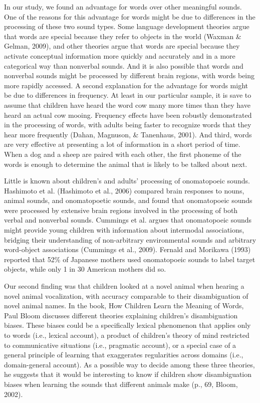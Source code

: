 \documentclass[english,floatsintext,man]{apa6}
\theoremstyle{definition}
\theoremstyle{definition}
\theoremstyle{definition}
\theoremstyle{remark}
\begin{document}
In our study, we found an advantage for words over other meaningful
sounds. One of the reasons for this advantage for words might be due to
differences in the processing of these two sound types. Some language
development theories argue that words are special because they refer to
objects in the world (Waxman \& Gelman, 2009), and other theories argue
that words are special because they activate conceptual information more
quickly and accurately and in a more categorical way than nonverbal
sounds. And it is also possible that words and nonverbal sounds might be
processed by different brain regions, with words being more rapidly
accessed. A second explanation for the advantage for words might be due
to differences in frequency. At least in our particular sample, it is
save to assume that children have heard the word cow many more times
than they have heard an actual cow mooing. Frequency effects have been
robustly demonstrated in the processing of words, with adults being
faster to recognize words that they hear more frequently (Dahan,
Magnuson, \& Tanenhaus, 2001). And third, words are very effective at
presenting a lot of information in a short period of time. When a dog
and a sheep are paired with each other, the first phoneme of the words
is enough to determine the animal that is likely to be talked about
next.

Little is known about children's and adults' processing of onomatopoeic
sounds. Hashimoto et al. (Hashimoto et al., 2006) compared brain
responses to nouns, animal sounds, and onomatopoetic sounds, and found
that onomatopoeic sounds were processed by extensive brain regions
involved in the processing of both verbal and nonverbal sounds. Cummings
et al. argues that onomatopoeic sounds might provide young children with
information about intermodal associations, bridging their understanding
of non-arbitrary environmental sounds and arbitrary word-object
associations (Cummings et al., 2009). Fernald and Morikawa (1993)
reported that 52\% of Japanese mothers used onomatopoeic sounds to label
target objects, while only 1 in 30 American mothers did so.

Our second finding was that children looked at a novel animal when
hearing a novel animal vocalization, with accuracy comparable to their
disambiguation of novel animal names. In the book, How Children Learn
the Meaning of Words, Paul Bloom discusses different theories explaining
children's disambiguation biases. These biases could be a specifically
lexical phenomenon that applies only to words (i.e., lexical account), a
product of children's theory of mind restricted to communicative
situations (i.e., pragmatic account), or a special case of a general
principle of learning that exaggerates regularities across domains
(i.e., domain-general account). As a possible way to decide among these
three theories, he suggests that it would be interesting to know if
children show disambiguation biases when learning the sounds that
different animals make (p., 69, Bloom, 2002).
\end{document}
